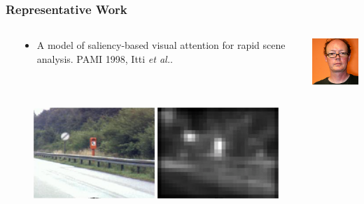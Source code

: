 \documentclass[notheorems,serif,table,compress]{beamer}  %
\begin{document}
\begin{frame}
\frametitle{Representative Work}
\begin{columns}
\begin{column}{\leftmargini}
\end{column}
\begin{column}{0.6\linewidth}
\begin{itemize}
\item A model of saliency-based visual attention for rapid scene analysis. PAMI 1998, Itti \textit{et al.}.
\end{itemize}
\end{column}
\begin{column}{0.45\linewidth}
\centering\includegraphics[width=1in]{itti}
\end{column}
\end{columns}\vspace{1ex}

\begin{figure}[!ht]
  \begin{minipage}[t]{0.45\textwidth}
  \includegraphics[width=1.8in]{sign}
  \end{minipage}
  \begin{minipage}[t]{0.45\textwidth}
  \includegraphics[width=1.8in]{signSaliency}
  \end{minipage}
  \end{figure} 
\end{frame}
\end{document}
